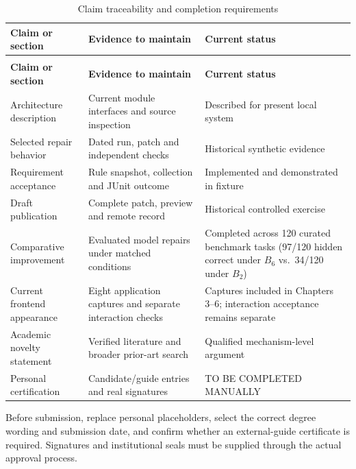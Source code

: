 \documentclass[12pt,a4paper,oneside]{report}
\begin{document}
\begingroup\normalsize\onehalfspacing\setlength{\tabcolsep}{4pt}\renewcommand{\arraystretch}{1.2}
\begin{longtable}{@{}>{\raggedright\arraybackslash}p{}>{\raggedright\arraybackslash}p{}>{\raggedright\arraybackslash}p{}@{}}
\caption{Claim traceability and completion requirements}\label{tab:A5.1}\\
\toprule
\textbf{Claim or section} & \textbf{Evidence to maintain} & \textbf{Current status}\\\midrule
\endfirsthead
\multicolumn{3}{l}{\small Table A5.1 continued}\\\toprule
\textbf{Claim or section} & \textbf{Evidence to maintain} & \textbf{Current status}\\\midrule
\endhead
\bottomrule\endfoot
Architecture description & Current module interfaces and source inspection & Described for present local system\\
Selected repair behavior & Dated run, patch and independent checks & Historical synthetic evidence\\
Requirement acceptance & Rule snapshot, collection and JUnit outcome & Implemented and demonstrated in fixture\\
Draft publication & Complete patch, preview and remote record & Historical controlled exercise\\
Comparative improvement & Evaluated model repairs under matched conditions & Completed across 120 curated benchmark tasks (97/120 hidden correct under $B_6$ vs.\ 34/120 under $B_2$)\\
Current frontend appearance & Eight application captures and separate interaction checks & Captures included in Chapters 3--6; interaction acceptance remains separate\\
Academic novelty statement & Verified literature and broader prior-art search & Qualified mechanism-level argument\\
Personal certification & Candidate/guide entries and real signatures & TO BE COMPLETED MANUALLY\\
\end{longtable}\endgroup

Before submission, replace personal placeholders, select the correct degree wording and submission date, and confirm whether an external-guide certificate is required. Signatures and institutional seals must be supplied through the actual approval process.
\end{document}

